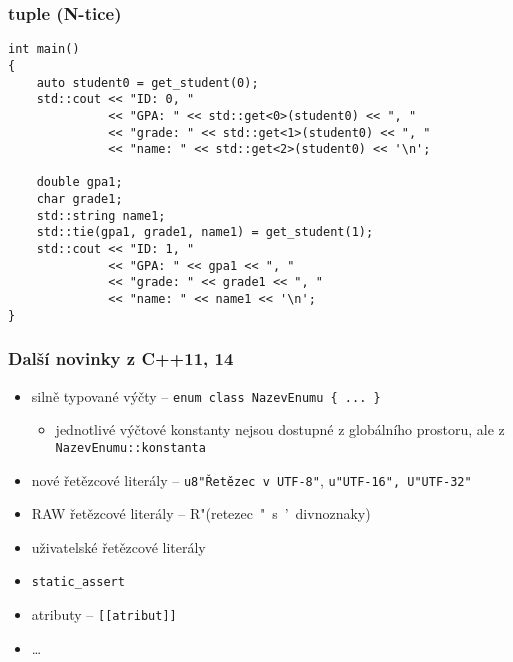 \begin{frame}[fragile]
\frametitle{tuple (N-tice)}

\begin{yesblock}
\begin{lstlisting}[basicstyle=\small]
int main()
{
    auto student0 = get_student(0);
    std::cout << "ID: 0, "
              << "GPA: " << std::get<0>(student0) << ", "
              << "grade: " << std::get<1>(student0) << ", "
              << "name: " << std::get<2>(student0) << '\n';
 
    double gpa1;
    char grade1;
    std::string name1;
    std::tie(gpa1, grade1, name1) = get_student(1);
    std::cout << "ID: 1, "
              << "GPA: " << gpa1 << ", "
              << "grade: " << grade1 << ", "
              << "name: " << name1 << '\n';
}
\end{lstlisting}
\end{yesblock}
\end{frame}









\begin{frame}[fragile]
\frametitle{Další novinky z C++11, 14}
\begin{bonusblock}{}
\begin{itemize}
\item silně typované výčty -- \lstinline|enum class NazevEnumu { ... }|
\begin{itemize}
\item jednotlivé výčtové konstanty nejsou dostupné z globálního prostoru, ale z \lstinline|NazevEnumu::konstanta|
\end{itemize}
\item nové řetězcové literály -- \lstinline|u8"Řetězec v UTF-8"|, \lstinline|u"UTF-16", U"UTF-32"|
\item RAW řetězcové literály -- {\ttfamily{}R}{\ttfamily\color[rgb]{0.627,0.126,0.941}"(retezec~"~s~'~divnoznaky)\dq}
\item uživatelské řetězcové literály
\item \lstinline|static_assert|
\item atributy -- \lstinline|[[atribut]]|
\item \ldots
\end{itemize}
\end{bonusblock}
\end{frame}






